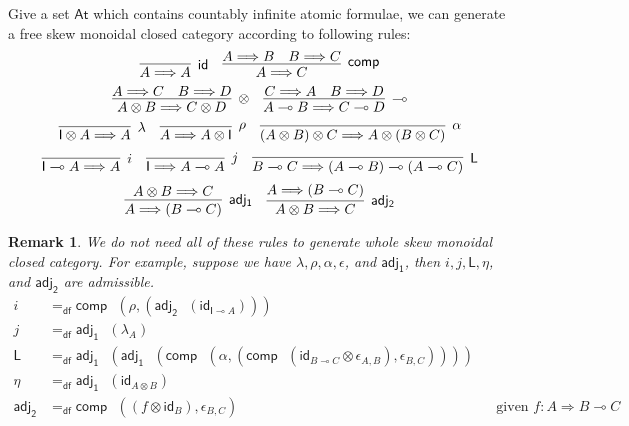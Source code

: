 \documentclass[submission,copyright,creativecommons]{eptcs}
\newtheorem{remark}[theorem]{Remark}
\newcommand{\id}{\mathsf{id}}
\newcommand{\ot}{\otimes}
\newcommand{\lolli}{\multimap}
\newcommand{\I}{\mathsf{I}}
\newcommand{\msfL}{\mathsf{L}}
\newcommand{\defeq}{=_{\mathsf{df}}}
\newcommand{\comp}{\mathsf{comp}}
\begin{document}
Give a set $\mathsf{At}$ which contains countably infinite atomic formulae, we can generate a free skew monoidal closed category according to following rules:
\begin{displaymath}
    \infer[\id]{A \Longrightarrow A}{}
    \quad
    \infer[\mathsf{comp}]{A \Longrightarrow C}{
      A \Longrightarrow B
      &
      B \Longrightarrow C
    }
\end{displaymath}
\begin{displaymath}
  \infer[\otimes]{A \ot B \Longrightarrow C \ot D}{
    A \Longrightarrow C
    &
    B \Longrightarrow D
  }
  \quad
  \infer[\lolli]{A \lolli B \Longrightarrow C \lolli D}{
    C \Longrightarrow A
    &
    B \Longrightarrow D
  }
\end{displaymath}
\begin{displaymath}
  \infer[\lambda]{\I \ot A \Longrightarrow A}{}
  \quad
  \infer[\rho]{A \Longrightarrow A \ot \I}{}
  \quad
  \infer[\alpha]{(A \ot B) \ot C \Longrightarrow A \ot (B \ot C)}{}
\end{displaymath}
\begin{displaymath}
  \infer[i]{\I \lolli A \Longrightarrow A}{}
  \quad
  \infer[j]{\I \Longrightarrow A \lolli A}{}
  \quad
  \infer[\mathsf{L}]{B \lolli C \Longrightarrow (A \lolli B) \lolli (A \lolli C)}{}
\end{displaymath}
\begin{displaymath}
  \infer[\mathsf{adj_1}]{A \Longrightarrow (B \lolli C)}{A \ot B \Longrightarrow C}
  \quad
  \infer[\mathsf{adj_2}]{A \ot B \Longrightarrow C}{A \Longrightarrow (B \lolli C)}
\end{displaymath}
\begin{remark}
  We do not need all of these rules to generate whole skew monoidal closed category.
  For example, suppose we have $\lambda , \rho , \alpha , \epsilon$, and $\mathsf{adj_1}$, then $i, j, \mathsf{L}, \eta$, and  $\mathsf{adj_2}$ are admissible.
  \begin{align*}
    i &\defeq \mathsf{comp} \text{ } (\rho ,  (\mathsf{adj_2} \text{ } (\id_{\I \lolli A})))
    \\
    j &\defeq \mathsf{adj_1} \text{ } (\lambda_{A})
    \\
    \msfL &\defeq \mathsf{adj_1} \text{ } (\mathsf{adj_1} \text{ } (\mathsf{comp} \text{ } (\alpha , (\mathsf{comp} \text{ } (\id_{B \lolli C} \ot \epsilon_{A,B}) , \epsilon_{B,C}))))
    \\
    \eta &\defeq \mathsf{adj_1} \text{ } (\id_{A \ot B})
    \\
    \mathsf{adj_2} &\defeq \comp \text{ } ((f \ot \id_{B}), \epsilon_{B,C}) &&\text{given } f : A \Longrightarrow B \lolli C
  \end{align*}
\end{remark}
\end{document}
